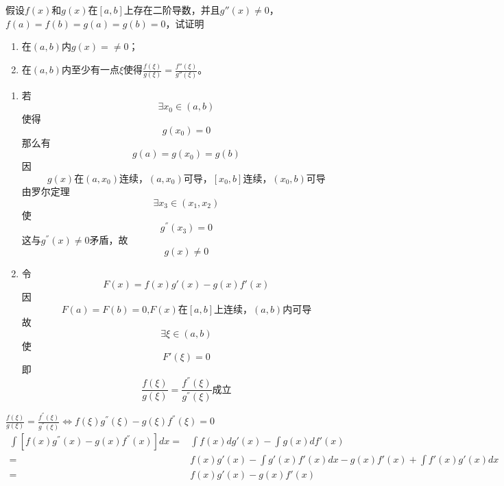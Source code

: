 \begin{example}
	假设$f(x)$和$g(x)$在$[a,b]$上存在二阶导数，并且$g''(x)\neq 0$，$f(a)=f(b)=g(a)=g(b)=0$，试证明
	\begin{enumerate}
		\item 在$(a,b)$内$g(x)=\neq 0$；
		\item 在$(a,b)$内至少有一点$\xi$使得$\frac{f(\xi)}{g(\xi)}=\frac{f''(\xi)}{g''(\xi)}$。
	\end{enumerate}
\end{example}
	\begin{newproof}
		\begin{enumerate}
			\item 若\[\exists x_0\in \left( a,b \right) \]
			使得\[g\left( x_0 \right) =0\]
			那么有\[g\left( a \right) =g\left( x_0 \right) =g\left( b \right) \]
			因\[g\left( x \right) \text{在}\left( a,x_0 \right) \text{连续，}\left( a,x_0 \right) \text{可导，}\left[ x_0,b \right] \text{连续，}\left( x_0,b \right) \text{可导}\]
			由罗尔定理\[\exists x_3\in \left( x_1,x_2 \right) \]
			使\[g^{''}\left( x_3 \right) =0\]
			这与$g^{''}\left( x \right) \ne 0$矛盾，故\[g\left( x \right) \ne 0\]

			\item 令\[F\left( x \right) =f\left( x \right) g'\left( x \right) -g\left( x \right) f'\left( x \right) \]
			因\[F\left( a \right) =F\left( b \right) =\text{0,}F\left( x \right) \text{在}\left[ a,b \right] \text{上连续，}\left( a,b \right) \text{内可导}\]
			故\[\exists \xi \in \left( a,b \right) \]
			使\[F'\left( \xi \right) =0\]
			即\[\frac{f\left( \xi \right)}{g\left( \xi \right)}=\frac{f^{''}\left( \xi \right)}{g^{''}\left( \xi \right)}\text{成立}\]
			
		\end{enumerate}
	\end{newproof}
	\begin{note}
	$\frac{f\left( \xi \right)}{g\left( \xi \right)}=\frac{f^{''}\left( \xi \right)}{g^{''}\left( \xi \right)}\Longleftrightarrow f\left( \xi \right) g^{''}\left( \xi \right) -g\left( \xi \right) f^{''}\left( \xi \right) =0$
	\begin{align*}
		\int{\left[ f\left( x \right) g^{''}\left( x \right) -g\left( x \right) f^{''}\left( x \right) \right]dx}
		= {}&
		\int{f\left( x \right) dg'\left( x \right) -\int{g\left( x \right) df'\left( x \right)}}\\
		={}&
		f\left( x \right) g'\left( x \right) -\int{g'\left( x \right) f'\left( x \right) dx}-g\left( x \right) f'\left( x \right) +\int{f'\left( x \right)}g'\left( x \right) dx\\
		={}&
		f\left( x \right) g'\left( x \right) -g\left( x \right) f'\left( x \right) 
	\end{align*}
	\end{note}
